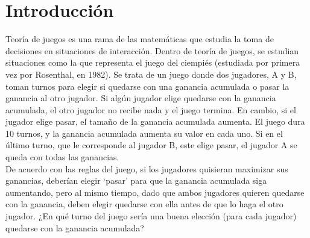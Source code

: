 
\chapter{Introducción} %

\label{Chapter1} %


\newcommand{\keyword}[1]{\textbf{#1}}
\newcommand{\tabhead}[1]{\textbf{#1}}
\newcommand{\code}[1]{\texttt{#1}}
\newcommand{\file}[1]{\texttt{\bfseries#1}}
\newcommand{\option}[1]{\texttt{\itshape#1}}


Teoría de juegos es una rama de las matemáticas que estudia la toma de decisiones en situaciones de interacción. Dentro de teoría de juegos, se estudian situaciones como la que representa el juego del ciempiés (estudiada por primera vez por Rosenthal, en 1982). Se trata de un juego donde dos jugadores, A y B, toman turnos para elegir si quedarse con una ganancia acumulada o pasar la ganancia al otro jugador. Si algún jugador elige quedarse con la ganancia acumulada, el otro jugador no recibe nada y el juego termina. En cambio, si el jugador elige pasar, el tamaño de la ganancia acumulada aumenta. El juego dura 10 turnos, y la ganancia acumulada aumenta su valor en cada uno. Si en el último turno, que le corresponde al jugador B, este elige pasar, el jugador A se queda con todas las ganancias.\\

De acuerdo con las reglas del juego, si los jugadores quisieran maximizar sus ganancias, deberían elegir ‘pasar’ para que la ganancia acumulada siga aumentando, pero al mismo tiempo, dado que ambos jugadores quieren quedarse con la ganancia, deben elegir quedarse con ella antes de que lo haga el otro jugador. ¿En qué turno del juego sería una buena elección (para cada jugador) quedarse con la ganancia acumulada?\\

